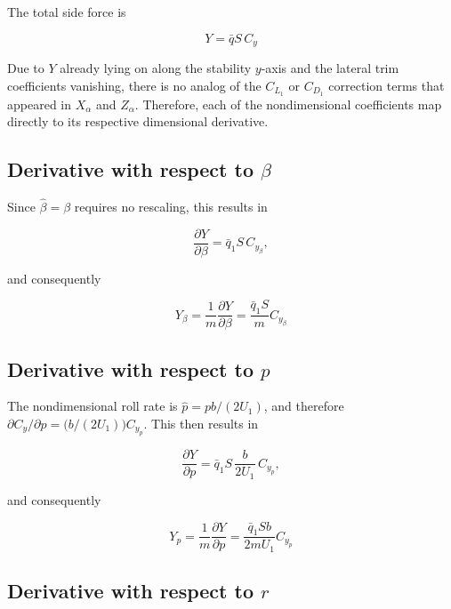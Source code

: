 \documentclass[11pt]{article}
\newcommand{\qbar}{\bar{q}}
\newcommand{\dd}[2]{\dfrac{\partial #1}{\partial #2}}
\begin{document}
The total side force is

\begin{equation}\label{eq:equation_33}
Y = \qbar S\,C_y
\end{equation}

Due to $Y$ already lying on along the stability $y$-axis and the lateral trim coefficients vanishing, there is no
analog of the $C_{L_1}$ or $C_{D_1}$ correction terms that appeared in $X_\alpha$ and $Z_\alpha$.
Therefore, each of the nondimensional coefficients map directly to its respective dimensional derivative.

\subsection{Derivative with respect to $\beta$}

Since $\hat\beta = \beta$ requires no rescaling, this results in

\begin{equation}\label{eq:equation_34}
\dd{Y}{\beta} = \qbar_1 S\,C_{y_\beta},
\end{equation}

and consequently

\begin{equation}\label{eq:equation_35}
\boxed{\;Y_\beta = \frac{1}{m}\dd{Y}{\beta} = \frac{\qbar_1 S}{m}C_{y_\beta}\;}
\end{equation}

\subsection{Derivative with respect to $p$}

The nondimensional roll rate is $\hat p = pb/(2U_1)$, and therefore
$\partial C_y/\partial p = \bigl(b/(2U_1)\bigr) C_{y_p}$.
This then results in

\begin{equation}\label{eq:equation_36}
\dd{Y}{p} = \qbar_1 S\,\frac{b}{2U_1}\,C_{y_p},
\end{equation}

and consequently

\begin{equation}\label{eq:equation_37}
\boxed{\;Y_p = \frac{1}{m}\dd{Y}{p} = \frac{\qbar_1 S b}{2mU_1}C_{y_p}\;}
\end{equation}

\subsection{Derivative with respect to $r$}
\end{document}
